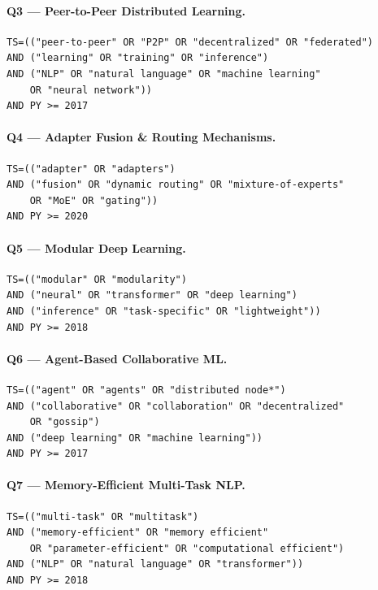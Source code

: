 \paragraph{Q3 — Peer-to-Peer Distributed Learning.}
\begin{verbatim}
TS=(("peer-to-peer" OR "P2P" OR "decentralized" OR "federated")
AND ("learning" OR "training" OR "inference")
AND ("NLP" OR "natural language" OR "machine learning"
    OR "neural network"))
AND PY >= 2017
\end{verbatim}

\paragraph{Q4 — Adapter Fusion \& Routing Mechanisms.}
\begin{verbatim}
TS=(("adapter" OR "adapters")
AND ("fusion" OR "dynamic routing" OR "mixture-of-experts"
    OR "MoE" OR "gating"))
AND PY >= 2020
\end{verbatim}

\paragraph{Q5 — Modular Deep Learning.}
\begin{verbatim}
TS=(("modular" OR "modularity")
AND ("neural" OR "transformer" OR "deep learning")
AND ("inference" OR "task-specific" OR "lightweight"))
AND PY >= 2018
\end{verbatim}

\paragraph{Q6 — Agent-Based Collaborative ML.}
\begin{verbatim}
TS=(("agent" OR "agents" OR "distributed node*")
AND ("collaborative" OR "collaboration" OR "decentralized"
    OR "gossip")
AND ("deep learning" OR "machine learning"))
AND PY >= 2017
\end{verbatim}

\paragraph{Q7 — Memory-Efficient Multi-Task NLP.}
\begin{verbatim}
TS=(("multi-task" OR "multitask")
AND ("memory-efficient" OR "memory efficient"
    OR "parameter-efficient" OR "computational efficient")
AND ("NLP" OR "natural language" OR "transformer"))
AND PY >= 2018
\end{verbatim}

